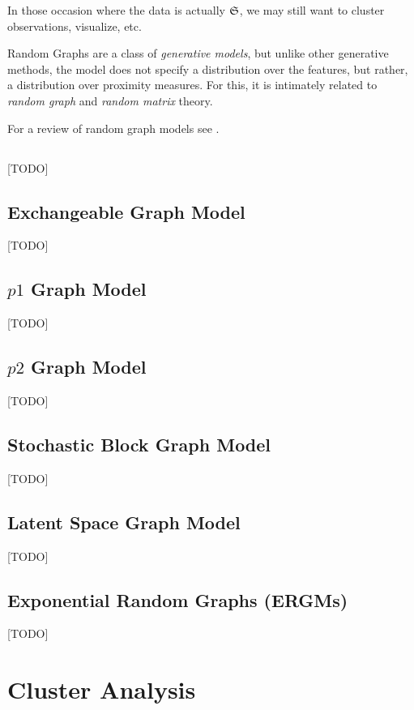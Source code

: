In those occasion where the data is actually $\mathfrak{S}$, we may still want to cluster observations, visualize, etc.

Random Graphs are a class of \emph{generative models}, but unlike other generative methods, the model does not specify a distribution over the features, but rather, a distribution over proximity measures.
For this, it is  intimately related to \emph{random graph} and \emph{random matrix} theory.

For a review of random graph models see \cite{goldenberg_survey_2010}.


\subsection{\erdos \renyi}
[TODO]

\subsection{Exchangeable Graph Model}
[TODO]

\subsection{$p1$ Graph Model}
[TODO]

\subsection{$p2$ Graph Model}
[TODO]

\subsection{Stochastic Block Graph Model}
[TODO]

\subsection{Latent Space Graph Model}
[TODO]

\subsection{Exponential Random Graphs (ERGMs)}
[TODO]

\begin{remark}
\end{remark}



\section{Cluster Analysis}
\label{sec:cluster_analysis}

